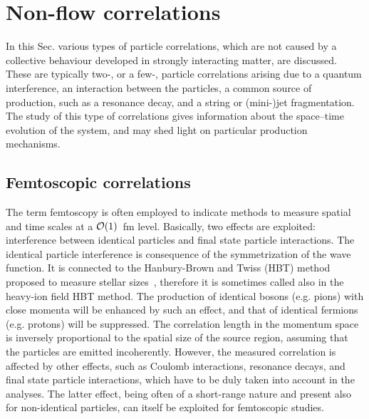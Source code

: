 \section{Non-flow correlations}
\label{secks:nonflow}
In this Sec. various types of particle correlations, which are not caused by a collective behaviour developed in strongly interacting matter, are discussed. These are typically two-, or a few-, particle correlations arising due to a quantum interference, an interaction between the particles, a common source of production, such as a resonance decay, and a string or (mini-)jet fragmentation. The study of this type of correlations gives information about the space--time evolution of the system, and may shed light on particular production mechanisms.
\subsection{Femtoscopic correlations}
\label{subsecks:femto}
The term femtoscopy is often employed to indicate methods to measure spatial and time scales at a ${\cal O}(1)$~fm level. Basically, two effects are exploited: interference between identical particles and final state particle interactions. The identical particle interference is consequence of the symmetrization of the wave function. It is connected to the Hanbury-Brown and Twiss (HBT) method proposed to measure stellar sizes~\cite{}, therefore it is sometimes called also in the heavy-ion field HBT method. The production of identical bosons (e.g. pions) with close momenta will be enhanced by such an effect, and that of identical fermions (e.g. protons) will be suppressed. The correlation length in the momentum space is inversely proportional to the spatial size of the source region, assuming that the particles are emitted incoherently. However, the measured correlation is affected by other effects, such as Coulomb interactions, resonance decays, and final state particle interactions, which have to be duly taken into account in the analyses. The latter effect, being often of a short-range nature and present also for non-identical particles, can itself be exploited for femtoscopic studies.

